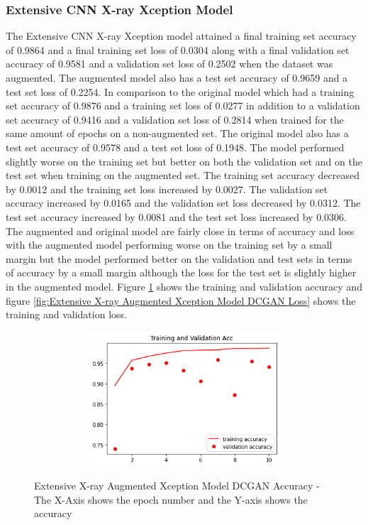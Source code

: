 \subsubsection{Extensive CNN X-ray Xception Model}
The Extensive CNN X-ray Xception model attained a final training set accuracy of 0.9864 and a final training set loss of 0.0304 along with a final validation set accuracy of 0.9581 and a validation set loss of 0.2502 when the dataset was augmented.  The augmented model also has a test set accuracy of 0.9659 and a test set loss of 0.2254.  In comparison to the original model which had a training set accuracy of 0.9876 and a training set loss of 0.0277 in addition to a validation set accuracy of 0.9416 and a validation set loss of 0.2814 when trained for the same amount of epochs on a non-augmented set.  The original model also has a test set accuracy of 0.9578 and a test set loss of 0.1948.  The model performed slightly worse on the training set but better on both the validation set and on the test set when training on the augmented set.  The training set accuracy decreased by 0.0012 and the training set loss increased by 0.0027. The validation set accuracy increased by 0.0165 and the validation set loss decreased by 0.0312.  The test set accuracy increased by 0.0081 and the test set loss increased by 0.0306. The augmented and original model are fairly close in terms of accuracy and loss with the augmented model performing worse on the training set by a small margin but the model performed better on the validation and test sets in terms of accuracy by a small margin although the loss for the test set is slightly higher in the augmented model. Figure \ref{fig:Extensive X-ray Augmented Xception Model DCGAN Accuracy} shows the training and validation accuracy and figure \ref{fig:Extensive X-ray Augmented Xception Model DCGAN Loss} shows the training and validation loss.
 \begin{figure}[H]
    \centering    \includegraphics[width=1\textwidth,height=5cm,keepaspectratio]{Images/XceptionBaselineTrainingValidationAccuracyExtensiveXray.png}\\
    \caption{Extensive X-ray Augmented Xception Model DCGAN Accuracy - The X-Axis shows the epoch number and the Y-axis shows the accuracy}
    \label{fig:Extensive X-ray Augmented Xception Model DCGAN Accuracy}
\end{figure}
